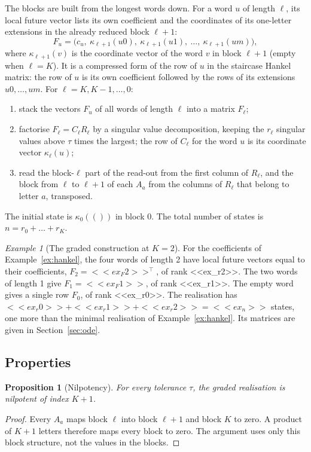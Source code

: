 \documentclass[11pt,a4paper]{article}
\newtheorem{proposition}{Proposition}
\theoremstyle{remark}
\newtheorem{example}{Example}
\begin{document}
The blocks are built from the longest words down.
For a word $u$ of length $\ell$, its local future vector lists its own coefficient and the coordinates of its one-letter extensions in the already reduced block $\ell+1$:
\begin{equation}
F_u=\bigl(c_u,\ \kappa_{\ell+1}(u0),\ \kappa_{\ell+1}(u1),\ \dots,\ \kappa_{\ell+1}(um)\bigr),
\end{equation}
where $\kappa_{\ell+1}(v)$ is the coordinate vector of the word $v$ in block $\ell+1$ (empty when $\ell=K$).
It is a compressed form of the row of $u$ in the staircase Hankel matrix: the row of $u$ is its own coefficient followed by the rows of its extensions $u0,\dots,um$.
For $\ell=K,K-1,\dots,0$:
\begin{enumerate}
\item stack the vectors $F_u$ of all words of length $\ell$ into a matrix $F_\ell$;
\item factorise $F_\ell=C_\ell R_\ell$ by a singular value decomposition, keeping the $r_\ell$ singular values above $\tau$ times the largest; the row of $C_\ell$ for the word $u$ is its coordinate vector $\kappa_\ell(u)$;
\item read the block-$\ell$ part of the read-out from the first column of $R_\ell$, and the block from $\ell$ to $\ell+1$ of each $A_a$ from the columns of $R_\ell$ that belong to letter $a$, transposed.
\end{enumerate}
The initial state is $\kappa_0(())$ in block 0.
The total number of states is $n=r_0+\dots+r_K$.

\begin{example}[The graded construction at $K=2$]\label{ex:graded}
For the coefficients of Example~\ref{ex:hankel}, the four words of length 2 have local future vectors equal to their coefficients, $F_2=<<ex_F2>>^\top$, of rank <<ex_r2>>.
The two words of length 1 give $F_1=<<ex_F1>>$, of rank <<ex_r1>>.
The empty word gives a single row $F_0$, of rank <<ex_r0>>.
The realisation has $<<ex_r0>>+<<ex_r1>>+<<ex_r2>>=<<ex_n>>$ states, one more than the minimal realisation of Example~\ref{ex:hankel}.
Its matrices are given in Section~\ref{sec:ode}.
\end{example}

\subsection{Properties}
\begin{proposition}[Nilpotency]\label{prop:nilpotent}
For every tolerance $\tau$, the graded realisation is nilpotent of index $K+1$.
\end{proposition}
\begin{proof}
Every $A_a$ maps block $\ell$ into block $\ell+1$ and block $K$ to zero.
A product of $K+1$ letters therefore maps every block to zero.
The argument uses only this block structure, not the values in the blocks.
\end{proof}
\end{document}

